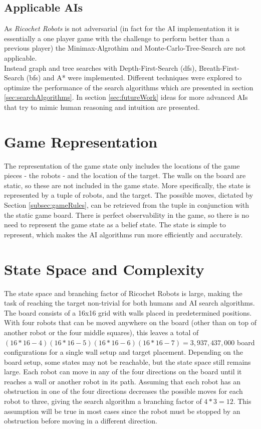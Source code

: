 \documentclass[a4paper,10pt]{article}
\begin{document}
  \subsection{Applicable AIs}
  As \textit{Ricochet Robots} is not adversarial (in fact for the AI implementation it is essentially a one player game with the challenge to perform better than a previous player) the Minimax-Algrothim and Monte-Carlo-Tree-Search are not applicable. \\
  Instead graph and tree searches with Depth-First-Search (dfs), Breath-First-Search (bfs) and A* were implemented. Different techniques were explored to optimize the performance of the search algorithms which are presented in section \ref{sec:searchAlgorithms}. In section \ref{sec:futureWork} ideas for more advanced AIs that try to mimic human reasoning and intuition are presented.

\section{Game Representation}
\label{sec:gameRep}
The representation of the game state only includes the locations of the game pieces - the robots - and the location of the target. The walls on the board are static,
so these are not included in the game state. More specifically, the state is represented by a tuple of robots, and the target. The possible moves, dictated by Section
\ref{subsec:gameRules}, can be retrieved from the tuple in conjunction with the static game board. There is perfect observability in the game, so there is no need to represent
the game state as a belief state. The state is simple to represent, which makes the AI algorithms run more efficiently and accurately.

\section{State Space and Complexity}
\label{sec:stateSpace}
The state space and branching factor of Ricochet Robots is large, making the task of reaching the target non-trivial for both humans and AI search algorithms.
The board consists of a 16x16 grid with walls placed in predetermined positions.  With four robots that can be moved anywhere on the board (other
than on top of another robot or the four middle squares), this leaves a total of $(16*16-4)(16*16-5)(16*16-6)(16*16-7) = 3,937,437,000$ board configurations for a single wall setup and
target placement.  Depending on the board setup, some states may not be reachable, but the state space still remains large. Each robot can move in any of the
four directions on the board until it reaches a wall or another robot in its path.  Assuming that each robot has an obstruction in one of the four directions
decreases the possible moves for each robot to three, giving the search algorithm a branching factor of $4*3 = 12$.  This assumption will be true in most cases since
the robot must be stopped by an obstruction before moving in a different direction. \\
\end{document}

